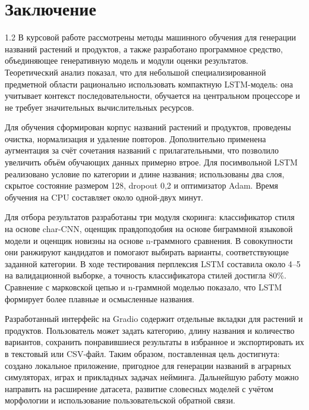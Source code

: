 \chapter*{Заключение}\label{ux437ux430ux43aux43bux44eux447ux435ux43dux438ux435}

\begin{spacing}{1.2}
\fontsize{13}{16.5}\selectfont
В курсовой работе рассмотрены методы машинного обучения для генерации названий растений и продуктов, а также разработано программное средство, объединяющее генеративную модель и модули оценки результатов. Теоретический анализ показал, что для небольшой специализированной предметной области рационально использовать компактную LSTM-модель: она учитывает контекст последовательности, обучается на центральном процессоре и не требует значительных вычислительных ресурсов.

Для обучения сформирован корпус названий растений и продуктов, проведены очистка, нормализация и удаление повторов. Дополнительно применена аугментация за счёт сочетания названий с прилагательными, что позволило увеличить объём обучающих данных примерно втрое. Для посимвольной LSTM реализовано условие по категории и длине названия; использованы два слоя, скрытое состояние размером 128, dropout 0,2 и оптимизатор Adam. Время обучения на CPU составляет около одной-двух минут.

Для отбора результатов разработаны три модуля скоринга: классификатор стиля на основе char-CNN, оценщик правдоподобия на основе биграммной языковой модели и оценщик новизны на основе n-граммного сравнения. В совокупности они ранжируют кандидатов и помогают выбирать варианты, соответствующие заданной категории. В ходе тестирования перплексия LSTM составила около 4--5 на валидационной выборке, а точность классификатора стилей достигла 80\%. Сравнение с марковской цепью и n-граммной моделью показало, что LSTM формирует более плавные и осмысленные названия.

Разработанный интерфейс на Gradio содержит отдельные вкладки для растений и продуктов. Пользователь может задать категорию, длину названия и количество вариантов, сохранить понравившиеся результаты в избранное и экспортировать их в текстовый или CSV-файл. Таким образом, поставленная цель достигнута: создано локальное приложение, пригодное для генерации названий в аграрных симуляторах, играх и прикладных задачах нейминга. Дальнейшую работу можно направить на расширение датасета, развитие словесных моделей с учётом морфологии и использование пользовательской обратной связи.
\end{spacing}

